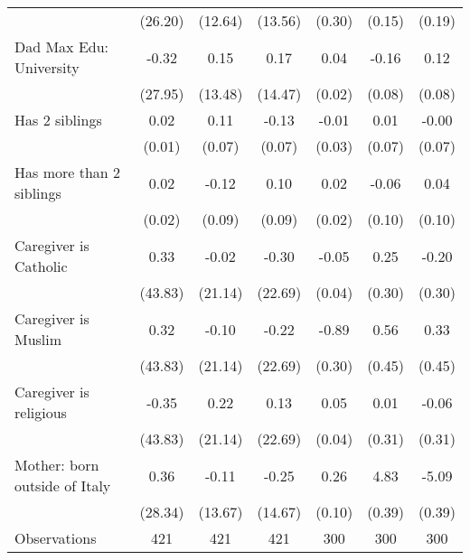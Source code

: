 {\begin{tabular}{l*{6}{c}}
                    &     (26.20)         &     (12.64)         &     (13.56)         &      (0.30)         &      (0.15)         &      (0.19)         \\
\addlinespace
Dad Max Edu: University&       -0.32         &        0.15         &        0.17         &        0.04         &       -0.16\sym{*}  &        0.12         \\
                    &     (27.95)         &     (13.48)         &     (14.47)         &      (0.02)         &      (0.08)         &      (0.08)         \\
\addlinespace
Has 2 siblings      &        0.02         &        0.11         &       -0.13         &       -0.01         &        0.01         &       -0.00         \\
                    &      (0.01)         &      (0.07)         &      (0.07)         &      (0.03)         &      (0.07)         &      (0.07)         \\
\addlinespace
Has more than 2 siblings&        0.02         &       -0.12         &        0.10         &        0.02         &       -0.06         &        0.04         \\
                    &      (0.02)         &      (0.09)         &      (0.09)         &      (0.02)         &      (0.10)         &      (0.10)         \\
\addlinespace
Caregiver is Catholic&        0.33         &       -0.02         &       -0.30         &       -0.05         &        0.25         &       -0.20         \\
                    &     (43.83)         &     (21.14)         &     (22.69)         &      (0.04)         &      (0.30)         &      (0.30)         \\
\addlinespace
Caregiver is Muslim &        0.32         &       -0.10         &       -0.22         &       -0.89\sym{**} &        0.56         &        0.33         \\
                    &     (43.83)         &     (21.14)         &     (22.69)         &      (0.30)         &      (0.45)         &      (0.45)         \\
\addlinespace
Caregiver is religious&       -0.35         &        0.22         &        0.13         &        0.05         &        0.01         &       -0.06         \\
                    &     (43.83)         &     (21.14)         &     (22.69)         &      (0.04)         &      (0.31)         &      (0.31)         \\
\addlinespace
Mother: born outside of Italy&        0.36         &       -0.11         &       -0.25         &        0.26\sym{**} &        4.83\sym{***}&       -5.09\sym{***}\\
                    &     (28.34)         &     (13.67)         &     (14.67)         &      (0.10)         &      (0.39)         &      (0.39)         \\
\midrule
Observations        &         421         &         421         &         421         &         300         &         300         &         300         \\
\bottomrule
\end{tabular}
}

